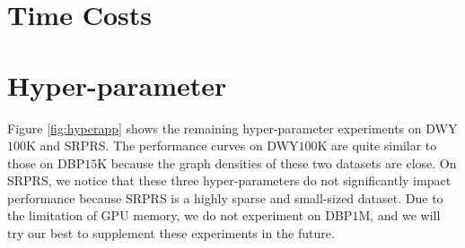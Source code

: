 \documentclass[11pt]{article}
\begin{document}
\section{Time Costs}
\begin{table}[h]
\begin{center}
\end{center}
\caption{Time costs of existing EA methods (seconds). Because we do not have enough time and devices to run all these methods by ourselves, these time costs are from the summary \cite{9174835} for reference only.}\label{tabel:timeapp}
\end{table}

\section{Hyper-parameter}
\label{sec:hyperapp}
Figure \ref{fig:hyperapp} shows the remaining hyper-parameter experiments on DWY$100$K and SRPRS.
The performance curves on DWY$100$K are quite similar to those on DBP$15$K because the graph densities of these two datasets are close.
On SRPRS, we notice that these three hyper-parameters do not significantly impact performance because SRPRS is a highly sparse and small-sized dataset.
Due to the limitation of GPU memory, we do not experiment on DBP$1$M, and we will try our best to supplement these experiments in the future.
\end{document}
